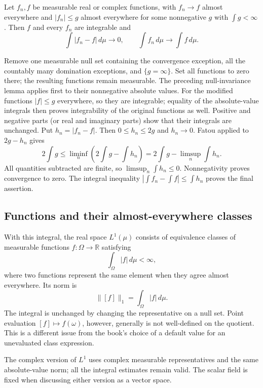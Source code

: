 \begin{theorem}
\label{thm:dominated_convergence}
Let $f_n,f$ be measurable real or complex functions, with $f_n\to f$
almost everywhere and $|f_n|\leq g$ almost everywhere for some
nonnegative $g$ with $\int g<\infty$. Then $f$ and every $f_n$ are
integrable and
\[
\int|f_n-f|\,d\mu\longrightarrow0,
\qquad \int f_n\,d\mu\longrightarrow\int f\,d\mu.
\]
\end{theorem}
\Proof
Remove one measurable null set containing the convergence exception,
all the countably many domination exceptions, and $\{g=\infty\}$.
Set all functions to zero there; the resulting functions remain measurable.
The preceding null-invariance lemma applies first to their nonnegative
absolute values. For the modified functions $|f|\leq g$ everywhere,
so they are integrable; equality of the absolute-value integrals then
proves integrability of the original functions as well. Positive and
negative parts (or real and imaginary parts) show that their integrals
are unchanged.
Put $h_n=|f_n-f|$. Then $0\leq h_n\leq2g$ and $h_n\to0$.
Fatou applied to $2g-h_n$ gives
\[
2\int g\leq\liminf_n\left(2\int g-\int h_n\right)
=2\int g-\limsup_n\int h_n.
\]
All quantities subtracted are finite, so $\limsup_n\int h_n\leq0$.
Nonnegativity proves convergence to zero. The integral inequality
$|\int f_n-\int f|\leq\int h_n$ proves the final assertion.
\Done

\subsection{Functions and their almost-everywhere classes}
With this integral, the real space
$L^1(\mu)$ consists of equivalence classes of measurable functions
$f:\Omega\to\mathbb{R}$ satisfying
\[
\int_\Omega |f|\,d\mu<\infty,
\]
where two functions represent the same element when they agree almost
everywhere. Its norm is
\[
\|[f]\|_1=\int_\Omega |f|\,d\mu.
\]
The integral is unchanged by changing the representative on a null set.
Point evaluation $[f]\mapsto f(\omega)$, however, generally is not
well-defined on the quotient. This is a different issue from the book's
choice of a default value for an unevaluated class expression.

The complex version of $L^1$ uses complex measurable representatives
and the same absolute-value norm; all the integral estimates remain valid.
The scalar field is fixed when discussing either version as a vector space.

